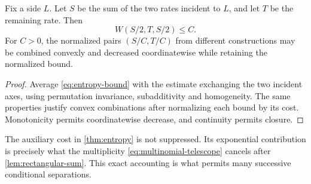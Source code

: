 \begin{corollary}\label{cor:balance}
Fix a side \(L\).
Let \(S\) be the sum of the two rates incident to \(L\), and let \(T\)
be the remaining rate.  Then
\begin{equation}\label{eq:balanced-rate}
 W(S/2,T,S/2)\le C.
\end{equation}
For \(C>0\), the normalized pairs \((S/C,T/C)\) from different constructions
may be combined convexly and decreased coordinatewise while retaining
the normalized bound.
\end{corollary}

\begin{proof}
Average \eqref{eq:entropy-bound} with the estimate exchanging the two
incident axes, using permutation invariance, subadditivity and
homogeneity.  The same properties justify convex combinations after
normalizing each bound by its cost.  Monotonicity permits coordinatewise
decrease, and continuity permits closure.
\end{proof}

The auxiliary cost in \cref{thm:entropy} is not suppressed.
Its exponential contribution is precisely what the multiplicity
\eqref{eq:multinomial-telescope} cancels after
\cref{lem:rectangular-sum}.
This exact accounting is what permits many successive conditional
separations.
